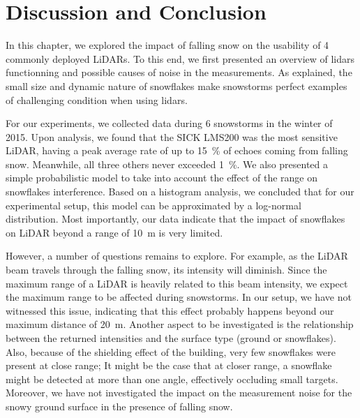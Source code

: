 \section{Discussion and Conclusion}
\label{sec:chap_lidar_conclu}

In this chapter, we explored the impact of falling snow on the usability of 4 commonly deployed LiDARs. To this end, we first presented an overview of \gls*{lidar}s functionning and possible causes of noise in the measurements. As explained, the small size and dynamic nature of snowflakes make snowstorms perfect examples of challenging condition when using \gls*{lidar}s.

For our experiments, we collected data during 6 snowstorms in the winter of 2015. Upon analysis, we found that the SICK LMS200 was the most sensitive LiDAR, having a peak average rate of up to \SI{15}{\percent} of echoes coming from falling snow. Meanwhile, all three others never exceeded \SI{1}{\percent}. We also presented a simple probabilistic model to take into account the effect of the range on snowflakes interference. Based on a histogram analysis, we concluded that for our experimental setup, this model can be approximated by a log-normal distribution. Most importantly, our data indicate that the impact of snowflakes on LiDAR beyond a range of \SI{10}{\meter} is very limited. 

However, a number of questions remains to explore. For example, as the LiDAR beam travels through the falling snow, its intensity will diminish. Since the maximum range of a LiDAR is heavily related to this beam intensity, we expect the maximum range to be affected during snowstorms. In our setup, we have not witnessed this issue, indicating that this effect probably happens beyond our maximum distance of \SI{20}{\meter}. Another aspect to be investigated is the relationship between the returned intensities and the surface type (ground or snowflakes). Also, because of the shielding effect of the building, very few snowflakes were present at close range; It might be the case that at closer range, a snowflake might be detected at more than one angle, effectively occluding small targets. Moreover, we have not investigated the impact on the measurement noise for the snowy ground surface in the presence of falling snow.
